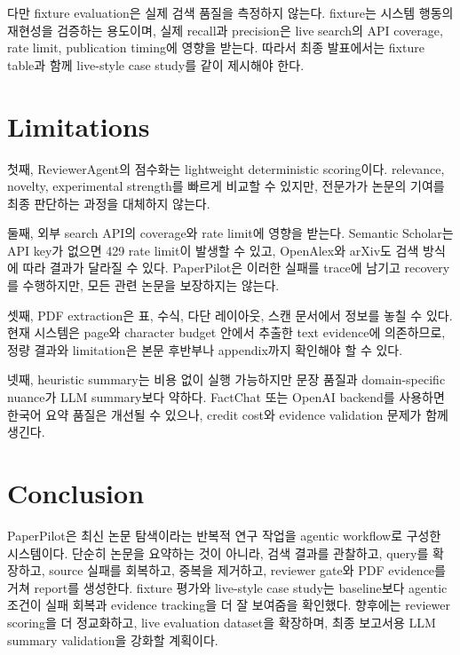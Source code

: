 \documentclass[sigconf,nonacm]{acmart}
\begin{document}
다만 fixture evaluation은 실제 검색 품질을 측정하지 않는다. fixture는 시스템 행동의 재현성을 검증하는 용도이며, 실제 recall과 precision은 live search의 API coverage, rate limit, publication timing에 영향을 받는다. 따라서 최종 발표에서는 fixture table과 함께 live-style case study를 같이 제시해야 한다.

\section{Limitations}

첫째, ReviewerAgent의 점수화는 lightweight deterministic scoring이다. relevance, novelty, experimental strength를 빠르게 비교할 수 있지만, 전문가가 논문의 기여를 최종 판단하는 과정을 대체하지 않는다.

둘째, 외부 search API의 coverage와 rate limit에 영향을 받는다. Semantic Scholar는 API key가 없으면 429 rate limit이 발생할 수 있고, OpenAlex와 arXiv도 검색 방식에 따라 결과가 달라질 수 있다. PaperPilot은 이러한 실패를 trace에 남기고 recovery를 수행하지만, 모든 관련 논문을 보장하지는 않는다.

셋째, PDF extraction은 표, 수식, 다단 레이아웃, 스캔 문서에서 정보를 놓칠 수 있다. 현재 시스템은 page와 character budget 안에서 추출한 text evidence에 의존하므로, 정량 결과와 limitation은 본문 후반부나 appendix까지 확인해야 할 수 있다.

넷째, heuristic summary는 비용 없이 실행 가능하지만 문장 품질과 domain-specific nuance가 LLM summary보다 약하다. FactChat 또는 OpenAI backend를 사용하면 한국어 요약 품질은 개선될 수 있으나, credit cost와 evidence validation 문제가 함께 생긴다.

\section{Conclusion}

PaperPilot은 최신 논문 탐색이라는 반복적 연구 작업을 agentic workflow로 구성한 시스템이다. 단순히 논문을 요약하는 것이 아니라, 검색 결과를 관찰하고, query를 확장하고, source 실패를 회복하고, 중복을 제거하고, reviewer gate와 PDF evidence를 거쳐 report를 생성한다. fixture 평가와 live-style case study는 baseline보다 agentic 조건이 실패 회복과 evidence tracking을 더 잘 보여줌을 확인했다. 향후에는 reviewer scoring을 더 정교화하고, live evaluation dataset을 확장하며, 최종 보고서용 LLM summary validation을 강화할 계획이다.



\end{document}
